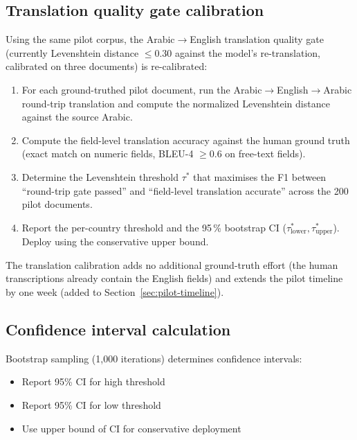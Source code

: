 \documentclass[11pt,a4paper,twoside]{report}
\begin{document}
\subsection{Translation quality gate calibration}
\label{sec:pilot-translation}

Using the same pilot corpus, the Arabic$\to$English translation
quality gate (currently Levenshtein distance $\le$0.30 against the
model's re-translation, calibrated on three documents) is
re-calibrated:

\begin{enumerate}
  \item For each ground-truthed pilot document, run the
        Arabic$\to$English$\to$Arabic round-trip translation and
        compute the normalized Levenshtein distance against the
        source Arabic.
  \item Compute the field-level translation accuracy against the
        human ground truth (exact match on numeric fields, BLEU-4
        $\ge$0.6 on free-text fields).
  \item Determine the Levenshtein threshold $\tau^{*}$ that
        maximises the F1 between ``round-trip gate passed'' and
        ``field-level translation accurate'' across the 200 pilot
        documents.
  \item Report the per-country threshold and the 95\,\% bootstrap
        CI ($\tau^{*}_{\mathrm{lower}}, \tau^{*}_{\mathrm{upper}}$).
        Deploy using the conservative upper bound.
\end{enumerate}

\noindent
The translation calibration adds no additional ground-truth effort
(the human transcriptions already contain the English fields) and
extends the pilot timeline by one week (added to
Section~\ref{sec:pilot-timeline}).

\subsection{Confidence interval calculation}

Bootstrap sampling (1,000 iterations) determines confidence intervals:
\begin{itemize}
  \item Report 95\% CI for high threshold
  \item Report 95\% CI for low threshold
  \item Use upper bound of CI for conservative deployment
\end{itemize}
\end{document}
